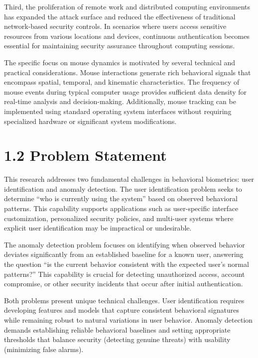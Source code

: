 \documentclass[
  12pt,
  a4paper,
]{report}
\begin{document}
Third, the proliferation of remote work and distributed computing
environments has expanded the attack surface and reduced the
effectiveness of traditional network-based security controls. In
scenarios where users access sensitive resources from various locations
and devices, continuous authentication becomes essential for maintaining
security assurance throughout computing sessions.

The specific focus on mouse dynamics is motivated by several technical
and practical considerations. Mouse interactions generate rich
behavioral signals that encompass spatial, temporal, and kinematic
characteristics. The frequency of mouse events during typical computer
usage provides sufficient data density for real-time analysis and
decision-making. Additionally, mouse tracking can be implemented using
standard operating system interfaces without requiring specialized
hardware or significant system modifications.

\section{1.2 Problem Statement}\label{problem-statement}

This research addresses two fundamental challenges in behavioral
biometrics: user identification and anomaly detection. The user
identification problem seeks to determine ``who is currently using the
system'' based on observed behavioral patterns. This capability supports
applications such as user-specific interface customization, personalized
security policies, and multi-user systems where explicit user
identification may be impractical or undesirable.

The anomaly detection problem focuses on identifying when observed
behavior deviates significantly from an established baseline for a known
user, answering the question ``is the current behavior consistent with
the expected user's normal patterns?'' This capability is crucial for
detecting unauthorized access, account compromise, or other security
incidents that occur after initial authentication.

Both problems present unique technical challenges. User identification
requires developing features and models that capture consistent
behavioral signatures while remaining robust to natural variations in
user behavior. Anomaly detection demands establishing reliable
behavioral baselines and setting appropriate thresholds that balance
security (detecting genuine threats) with usability (minimizing false
alarms).
\end{document}
